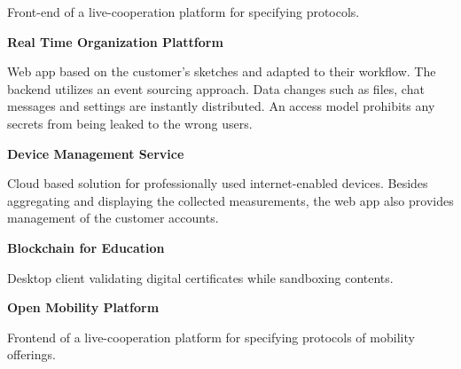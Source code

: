 \documentclass[12pt,a4paper,ragged2e,withhyper]{altacv} %
\begin{document}
\begin{paracol}{2}
\medskip
{}  

\divider

\vspace{-4pt}
Front-end of a live-cooperation platform for specifying protocols.

\medskip
{}

\medskip
{}     

\switchcolumn



\textbf{Real Time Organization Plattform}

Web app based on the customer's sketches and adapted to their workflow.
The backend utilizes an event sourcing approach.
Data changes such as files, chat messages and settings are instantly distributed.
An access model prohibits any secrets from being leaked to the wrong users.

\smallskip


\medskip

\textbf{Device Management Service}

Cloud based solution for professionally used internet-enabled devices.
Besides aggregating and displaying the collected measurements,
the web app also provides management of the customer accounts.

\smallskip


\divider


\textbf{Blockchain for Education}

Desktop client validating digital certificates while sandboxing contents.

\smallskip


\medskip

\textbf{Open Mobility Platform}

Frontend of a live-cooperation platform for specifying protocols of mobility offerings.


\end{paracol}
\end{document}
